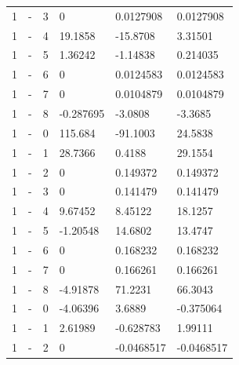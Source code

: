 \begin{longtable}
{}1 & \allowbreak{}-\allowbreak{} & 3 & 0 & 0.0127908 & 0.0127908 \\
{}1 & \allowbreak{}-\allowbreak{} & 4 & 19.1858 & -15.8708 & 3.31501 \\
{}1 & \allowbreak{}-\allowbreak{} & 5 & 1.36242 & -1.14838 & 0.214035 \\
{}1 & \allowbreak{}-\allowbreak{} & 6 & 0 & 0.0124583 & 0.0124583 \\
{}1 & \allowbreak{}-\allowbreak{} & 7 & 0 & 0.0104879 & 0.0104879 \\
{}1 & \allowbreak{}-\allowbreak{} & 8 & -0.287695 & -3.0808 & -3.3685 \\
{}1 & \allowbreak{}-\allowbreak{} & 0 & 115.684 & -91.1003 & 24.5838 \\
{}1 & \allowbreak{}-\allowbreak{} & 1 & 28.7366 & 0.4188 & 29.1554 \\
{}1 & \allowbreak{}-\allowbreak{} & 2 & 0 & 0.149372 & 0.149372 \\
{}1 & \allowbreak{}-\allowbreak{} & 3 & 0 & 0.141479 & 0.141479 \\
{}1 & \allowbreak{}-\allowbreak{} & 4 & 9.67452 & 8.45122 & 18.1257 \\
{}1 & \allowbreak{}-\allowbreak{} & 5 & -1.20548 & 14.6802 & 13.4747 \\
{}1 & \allowbreak{}-\allowbreak{} & 6 & 0 & 0.168232 & 0.168232 \\
{}1 & \allowbreak{}-\allowbreak{} & 7 & 0 & 0.166261 & 0.166261 \\
{}1 & \allowbreak{}-\allowbreak{} & 8 & -4.91878 & 71.2231 & 66.3043 \\
{}1 & \allowbreak{}-\allowbreak{} & 0 & -4.06396 & 3.6889 & -0.375064 \\
{}1 & \allowbreak{}-\allowbreak{} & 1 & 2.61989 & -0.628783 & 1.99111 \\
{}1 & \allowbreak{}-\allowbreak{} & 2 & 0 & -0.0468517 & -0.0468517 \\

\end{longtable}
